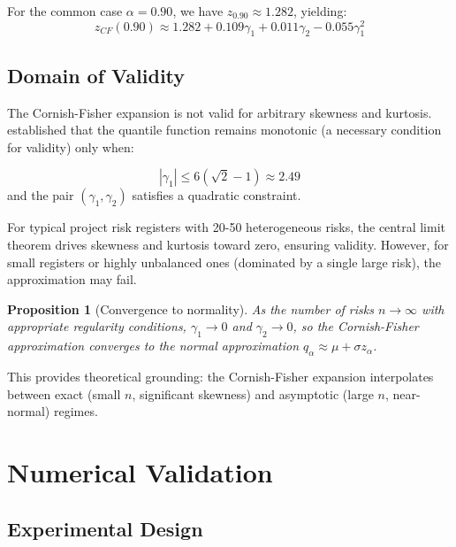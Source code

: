 \documentclass[12pt,a4paper]{article}
\newtheorem{proposition}[theorem]{Proposition}
\theoremstyle{definition}
\theoremstyle{remark}
\begin{document}
For the common case $\alpha = 0.90$, we have $z_{0.90} \approx 1.282$, yielding:
\begin{equation}
    z_{CF}(0.90) \approx 1.282 + 0.109\gamma_1 + 0.011\gamma_2 - 0.055\gamma_1^2
\end{equation}

\subsection{Domain of Validity}

The Cornish-Fisher expansion is not valid for arbitrary skewness and kurtosis. \citet{Maillard2012} established that the quantile function remains monotonic (a necessary condition for validity) only when:

\begin{equation}
\label{eq:cf_validity}
    |\gamma_1| \leq 6(\sqrt{2} - 1) \approx 2.49
\end{equation}
and the pair $(\gamma_1, \gamma_2)$ satisfies a quadratic constraint.

For typical project risk registers with 20-50 heterogeneous risks, the central limit theorem drives skewness and kurtosis toward zero, ensuring validity. However, for small registers or highly unbalanced ones (dominated by a single large risk), the approximation may fail.

\begin{proposition}[Convergence to normality]
\label{prop:convergence}
As the number of risks $n \to \infty$ with appropriate regularity conditions, $\gamma_1 \to 0$ and $\gamma_2 \to 0$, so the Cornish-Fisher approximation converges to the normal approximation $q_\alpha \approx \mu + \sigma z_\alpha$.
\end{proposition}

This provides theoretical grounding: the Cornish-Fisher expansion interpolates between exact (small $n$, significant skewness) and asymptotic (large $n$, near-normal) regimes.

\section{Numerical Validation}
\label{sec:validation}

\subsection{Experimental Design}
\end{document}
